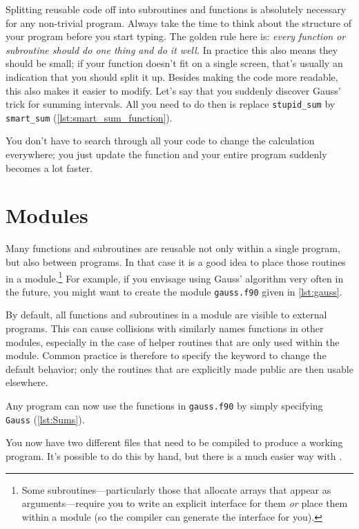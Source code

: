 Splitting reusable code off into subroutines and functions is absolutely necessary for any non-trivial program.
Always take the time to think about the structure of your program before you start typing.
The golden rule here is: \emph{every function or subroutine should do one thing and do it well.}
In practice this also means they should be small; if your function doesn't fit on a single screen, that's usually an indication that you should split it up.
Besides making the code more readable, this also makes it easier to modify.
Let's say that you suddenly discover Gauss' trick for summing intervals.
All you need to do then is replace \texttt{stupid\_sum} by \texttt{smart\_sum} (\autoref{lst:smart_sum_function}).

You don't have to search through all your code to change the calculation everywhere; you just update the function and your entire program suddenly becomes a lot faster.

\section{Modules}

Many functions and subroutines are reusable not only within a single program, but also between programs.
In that case it is a good idea to place those routines in a module.\footnote{Some subroutines---particularly those that allocate arrays that appear as arguments---require you to write an explicit interface for them \emph{or} place them within a module (so the compiler can generate the interface for you).}
For example, if you envisage using Gauss' algorithm very often in the future, you might want to create the module \texttt{gauss.f90} given in \autoref{lst:gauss}.

By default, all functions and subroutines in a module are visible to external programs.
This can cause collisions with similarly names functions in other modules, especially in the case of helper routines that are only used within the module.
Common practice is therefore to specify the  keyword to change the default behavior; only the routines that are explicitly made public are then usable elsewhere.

Any program can now use the functions in \texttt{gauss.f90} by simply specifying \texttt{ Gauss} (\autoref{lst:Sums}).

You now have two different files that need to be compiled to produce a working program.
It's possible to do this by hand, but there is a much easier way with .

